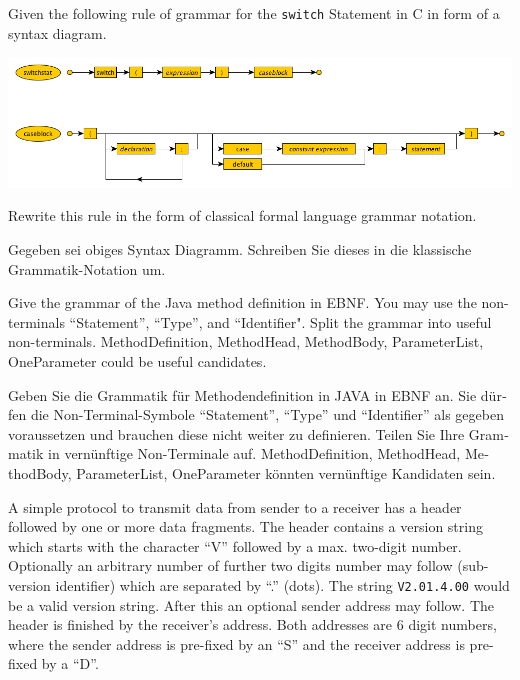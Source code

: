 \documentclass{exam}
\theoremstyle{definition}
\theoremstyle{definition}
\begin{document}
\begin{questions}
	Given the following rule of grammar for the {\tt switch} Statement in C in form of a syntax diagram.
	
	\includegraphics[scale=.5]{SyntaxDiagramCSwitchStatement.png}
	
	Rewrite this rule in the form of classical formal language grammar notation.
	
	\begin{otherlanguage}{german}
		Gegeben sei obiges Syntax Diagramm. Schreiben Sie dieses in die klassische Grammatik-Notation um.
	\end{otherlanguage}
	
Give the grammar of the Java method definition in EBNF. You may use the non-terminals ``Statement'', ``Type'', and ``Identifier". Split the grammar into useful non-terminals. MethodDefinition, MethodHead, MethodBody, ParameterList, OneParameter could be useful candidates.

\begin{otherlanguage}{german}
	Geben Sie die Grammatik für Methodendefinition in JAVA in EBNF an. Sie dürfen die Non-Terminal-Symbole ``Statement'', ``Type'' und ``Identifier'' als gegeben voraussetzen und brauchen diese nicht weiter zu definieren. Teilen Sie Ihre Grammatik in vernünftige Non-Terminale auf. MethodDefinition, MethodHead, MethodBody, ParameterList, OneParameter könnten vernünftige Kandidaten sein.
\end{otherlanguage}

A simple protocol to transmit data from sender to a receiver has a header followed by one or more data fragments. The header contains a version string which starts with the character ``V'' followed by a max. two-digit number. Optionally an arbitrary number of further two digits number may follow (sub-version identifier) which are separated by ``.'' (dots). The string {\tt V2.01.4.00} would be a valid version string. After this an optional sender address may follow. The header is finished by the receiver's address. Both addresses are 6 digit numbers, where the sender address is pre-fixed by an ``S'' and the receiver address is pre-fixed by a ``D''.


\end{questions}
\end{document}
